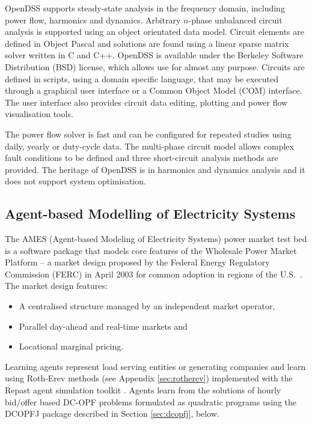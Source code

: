 OpenDSS supports steady-state analysis in the frequency domain, including power
flow, harmonics and dynamics.  Arbitrary $n$-phase unbalanced circuit analysis
is supported using an object orientated data model.  Circuit elements are defined in Object Pascal and solutions are found using a linear sparse matrix solver written in C and
C++.  OpenDSS is available under the Berkeley Software Distribution (BSD)
license, which allows use for almost any purpose.  Circuits are defined in
scripts, using a domain specific language, that may be executed through a
graphical user interface or a Common Object Model (COM) interface.  The user
interface also provides circuit data editing, plotting and power flow
visualisation tools.

The power flow solver is fast and can be configured for repeated
studies using daily, yearly or duty-cycle data.  The multi-phase circuit model allows
complex fault conditions to be defined and three short-circuit analysis methods
are provided.  The heritage of OpenDSS is in harmonics and dynamics analysis
and it does not support system optimisation.

\subsection*{Agent-based Modelling of Electricity Systems}
\label{sec:ames}
The AMES (Agent-based Modeling of Electricity Systems) power market test bed is
a software package that models core features of the Wholesale Power Market
Platform -- a market design proposed by the Federal Energy Regulatory
Commission (FERC) in April 2003 for common adoption in regions of the
U.S.~\cite{tesfatsi:wpmp}. The market design features:
\begin{itemize}
  \item A centralised structure managed by an independent market operator,
  \item Parallel day-ahead and real-time markets and
  \item Locational marginal pricing.
\end{itemize}
Learning agents represent load serving entities or generating companies and
learn using Roth-Erev methods (see Appendix \ref{sec:rotherev})
implemented with the Repast agent simulation toolkit \cite{gieseler:thesis}.
Agents learn from the solutions of hourly bid/offer based
DC-OPF problems formulated as quadratic programs using the DCOPFJ package
\cite{tesfatsi:dcopf} described in Section \ref{sec:dcopfj}, below.

